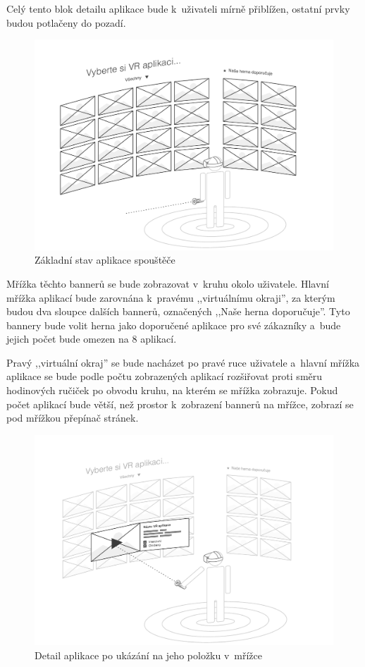 Celý tento blok
detailu aplikace bude k~uživateli mírně přiblížen, ostatní prvky budou
potlačeny do pozadí.

\begin{figure}[h!]
\centering
\includegraphics[width=\textwidth]{src/assets/wireframe-grid.pdf}
\caption{Základní stav aplikace spouštěče}
\end{figure}

Mřížka těchto bannerů se bude zobrazovat v~kruhu okolo uživatele. Hlavní
mřížka aplikací bude zarovnána k~pravému ,,virtuálnímu okraji'', za
kterým budou dva sloupce dalších bannerů, označených ,,Naše herna
doporučuje''. Tyto bannery bude volit herna jako doporučené aplikace pro
své zákazníky a~bude jejich počet bude omezen na 8 aplikací. 

Pravý ,,virtuální okraj'' se bude nacházet po pravé ruce uživatele a~hlavní
mřížka aplikace se bude podle počtu zobrazených aplikací rozšiřovat
proti směru hodinových ručiček po obvodu kruhu, na kterém se mřížka
zobrazuje. Pokud počet aplikací bude větší, než prostor k~zobrazení
bannerů na mřížce, zobrazí se pod mřížkou přepínač stránek.

\begin{figure}[h!]
\centering
\includegraphics[width=\textwidth]{src/assets/wireframe-detail.pdf}
\caption{Detail aplikace po ukázání na jeho položku v~mřížce}
\end{figure}

